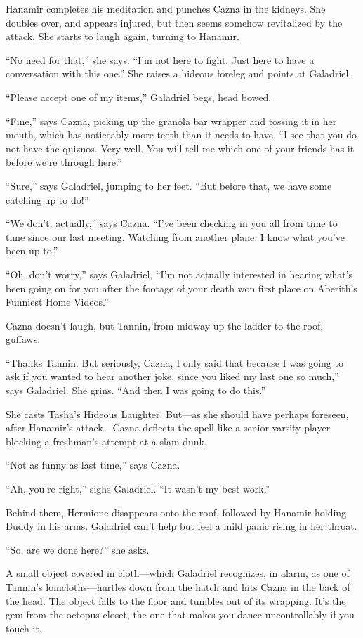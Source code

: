 \documentclass[smalldemyvopaper,11pt,twoside,onecolumn,openright,extrafontsizes]{memoir}
\begin{document}
Hanamir completes his meditation and punches Cazna in the kidneys. She
doubles over, and appears injured, but then seems somehow revitalized by
the attack. She starts to laugh again, turning to Hanamir.

``No need for that,'' she says. ``I'm not here to fight. Just here to
have a conversation with this one.'' She raises a hideous foreleg and
points at Galadriel.

``Please accept one of my items,'' Galadriel begs, head bowed.

``Fine,'' says Cazna, picking up the granola bar wrapper and tossing it
in her mouth, which has noticeably more teeth than it needs to have. ``I
see that you do not have the quiznos. Very well. You will tell me which
one of your friends has it before we're through here.''

``Sure,'' says Galadriel, jumping to her feet. ``But before that, we
have some catching up to do!''

``We don't, actually,'' says Cazna. ``I've been checking in you all from
time to time since our last meeting. Watching from another plane. I know
what you've been up to.''

``Oh, don't worry,'' says Galadriel, ``I'm not actually interested in
hearing what's been going on for you after the footage of your death won
first place on Aberith's Funniest Home Videos.''

Cazna doesn't laugh, but Tannin, from midway up the ladder to the roof,
guffaws.

``Thanks Tannin. But seriously, Cazna, I only said that because I was
going to ask if you wanted to hear another joke, since you liked my last
one so much,'' says Galadriel. She grins. ``And then I was going to do
this.''

She casts Tasha's Hideous Laughter. But---as she should have perhaps
foreseen, after Hanamir's attack---Cazna deflects the spell like a
senior varsity player blocking a freshman's attempt at a slam dunk.

``Not as funny as last time,'' says Cazna.

``Ah, you're right,'' sighs Galadriel. ``It wasn't my best work.''

Behind them, Hermione disappears onto the roof, followed by Hanamir
holding Buddy in his arms. Galadriel can't help but feel a mild panic
rising in her throat.

``So, are we done here?'' she asks.

A small object covered in cloth---which Galadriel recognizes, in alarm,
as one of Tannin's loincloths---hurtles down from the hatch and hits
Cazna in the back of the head. The object falls to the floor and tumbles
out of its wrapping. It's the gem from the octopus closet, the one that
makes you dance uncontrollably if you touch it.
\end{document}
